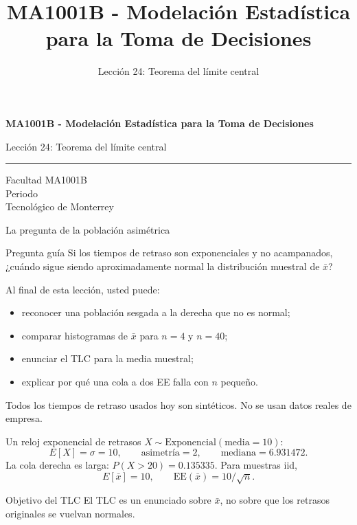 \documentclass[aspectratio=169,10pt,spanish]{beamer}
\title{MA1001B - Modelación Estadística para la Toma de Decisiones}
\subtitle{Lección 24: Teorema del límite central}
\author{}
\institute{Tecnol\'ogico de Monterrey}
\date{}
\begin{document}
\begin{frame}[plain]
  \vspace{1.2cm}
  {\Large\bfseries MA1001B - Modelación Estadística para la Toma de Decisiones\par}
  \vspace{0.7cm}
  {\large Lección 24: Teorema del límite central\par}
  \vspace{0.7cm}
  {\color{TecRojo}\rule{\textwidth}{1.2pt}}
  \vspace{0.8cm}

  Facultad MA1001B\\[0.3cm]
  Periodo\\[0.3cm]
  Tecnol\'ogico de Monterrey
\end{frame}

\begin{frame}{La pregunta de la población asimétrica}
  \begin{alertblock}{Pregunta guía}
    Si los tiempos de retraso son exponenciales y no acampanados, ¿cuándo
    sigue siendo aproximadamente normal la distribución muestral de $\bar x$?
  \end{alertblock}

  \vspace{0.6em}
  Al final de esta lección, usted puede:
  \begin{itemize}
    \item reconocer una población sesgada a la derecha que no es normal;
    \item comparar histogramas de $\bar x$ para $n=4$ y $n=40$;
    \item enunciar el TLC para la media muestral;
    \item explicar por qué una cola a dos EE falla con $n$ pequeño.
  \end{itemize}

  \vfill
  \scriptsize Todos los tiempos de retraso usados hoy son sintéticos. No se usan datos reales de empresa.
\end{frame}

\begin{frame}{Un reloj exponencial de retrasos}
  \small
  $X\sim\mathrm{Exponencial}(\text{media}=10)$:
  \[
    E[X]=\sigma=10,\qquad \text{asimetría}=2,\qquad \text{mediana}=6.931472.
  \]
  La cola derecha es larga: $P(X>20)=0.135335$.
  Para muestras iid,
  \[
    E[\bar x]=10,\qquad \mathrm{EE}(\bar x)=10/\sqrt{n}.
  \]

  \vspace{0.3em}
  \begin{exampleblock}{Objetivo del TLC}
    El TLC es un enunciado sobre $\bar x$, no sobre que los retrasos
    originales se vuelvan normales.
  \end{exampleblock}
\end{frame}
\end{document}
